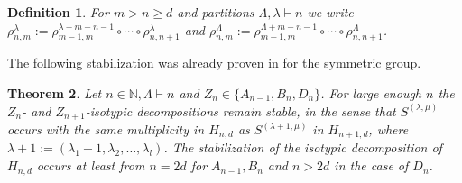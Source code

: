 \documentclass[11pt,a4paper]{amsart}
\numberwithin{equation}{section}
\newtheorem{thm}{Theorem}
\newtheorem{definition}[thm]{Definition}
\theoremstyle{definition}
\newcommand{\N}{\mathbb{N}}
\numberwithin{thm}{section}
\theoremstyle{break}
\numberwithin{subcase}{case}
\begin{document}
\begin{definition}
For $m>n\geq d$ and partitions $\Lambda,\lambda \vdash n$ we write $\rho_{n,m}^\lambda := \rho_{m-1,m}^{\lambda + m-n-1} \circ \cdots \circ \rho_{n,n+1}^{\lambda}$ and $\rho_{n,m}^\Lambda := \rho_{m-1,m}^{\Lambda + m-n-1} \circ \cdots \circ \rho_{n,n+1}^{\Lambda}$.
\end{definition}

The following stabilization was already proven in \cite{phdthesis} for the symmetric group.
\begin{thm} \label{thm:ModulesStabilize}
Let $n \in \N, \Lambda \vdash n$ and $Z_n \in \{A_{n-1},B_n,D_n\}$. For large enough $n$ the $Z_n$- and $Z_{n+1}$-isotypic decompositions remain stable, in the sense that $S^{(\lambda,\mu)}$ occurs with the same multiplicity in $H_{n,d}$ as $S^{(\lambda +1,\mu)}$ in $H_{n+1,d}$, where $\lambda +1 := (\lambda_1+1,\lambda_2,\ldots,\lambda_l)$. The stabilization of the isotypic decomposition of $H_{n,d}$ occurs at least from $n = 2d$ for $A_{n-1},B_n$ and $n > 2d$ in the case of $D_n$. 
\end{thm}
\end{document}
